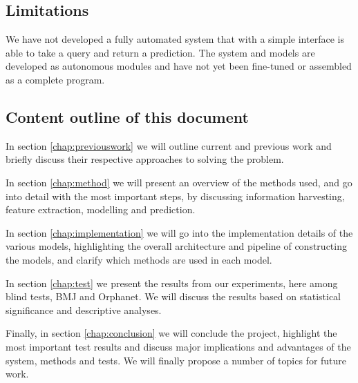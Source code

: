 \documentclass[10pt,letterpaper,two column,final]{article}
\begin{document}



\subsection{Limitations}
We have not developed a fully automated system that with a simple
interface is able to take a query and return a prediction. The system
and models are developed as autonomous modules and have not yet been
fine-tuned or assembled as a complete program.


\subsection{Content outline of this document}
In section \ref{chap:previouswork} we will outline current and previous
work and briefly discuss their respective approaches to solving the
problem.

In section \ref{chap:method} we will present an overview of the methods
used, and go into detail with the most important steps, by discussing
information harvesting, feature extraction, modelling and prediction.


In section \ref{chap:implementation} we will go into the implementation
details of the various models, highlighting the overall architecture and
pipeline of constructing the models, and clarify which methods are used
in each model.


In section \ref{chap:test} we present the results from our experiments,
here among blind tests, BMJ and Orphanet. We will discuss the results
based on statistical significance and descriptive analyses.

Finally, in section \ref{chap:conclusion} we will conclude the project,
highlight the most important test results and discuss major implications
and advantages of the system, methods and tests. We will finally propose
a number of topics for future work.


\end{document}
